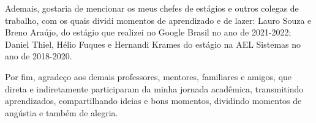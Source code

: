 Ademais, gostaria de mencionar os meus chefes de estágios e outros colegas de trabalho, com os quais dividi momentos de aprendizado e de lazer: Lauro Souza e Breno Araújo, do estágio que realizei no Google Brasil no ano de 2021-2022; Daniel Thiel, Hélio Fuques e Hernandi Krames do estágio na AEL Sistemas no ano de 2018-2020.

Por fim, agradeço aos demais professores, mentores, familiares e amigos, que direta e indiretamente participaram da minha jornada acadêmica, transmitindo aprendizados, compartilhando ideias e bons momentos, dividindo momentos de angústia e também de alegria.

\clearpage
